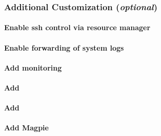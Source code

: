 \documentclass[letterpaper]{article}
\begin{document}
\subsubsection{Additional Customization ({\em optional})} \label{sec:addl_customizations}



\paragraph{Enable ssh control via resource manager} 



\paragraph{Enable forwarding of system logs} \label{sec:add_syslog}


\paragraph{Add \Nagios{} monitoring} \label{sec:add_nagios}


\paragraph{Add \clustershell{}}


\paragraph{Add \genders{}}


\paragraph{Add Magpie}

\end{document}
